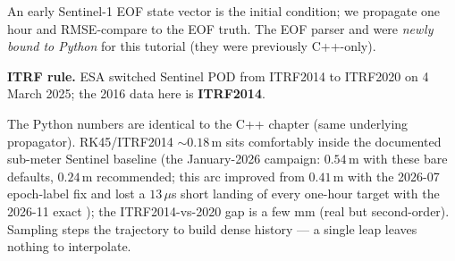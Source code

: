 An early Sentinel-1 EOF state vector is the initial condition; we propagate
one hour and RMSE-compare to the EOF truth. The EOF parser and
 were \emph{newly bound to Python} for
this tutorial (they were previously C++-only).

\textbf{ITRF rule.} ESA switched Sentinel POD from ITRF2014 to ITRF2020 on
4 March 2025; the 2016 data here is \textbf{ITRF2014}.


The Python numbers are identical to the C++ chapter (same underlying
propagator). RK45/ITRF2014 ${\sim}0.18\,$m sits comfortably inside the
documented sub-meter Sentinel baseline (the January-2026 campaign: $0.54\,$m
with these bare defaults, $0.24\,$m recommended; this arc improved from
$0.41\,$m with the 2026-07 epoch-label fix and lost a $13\,\mu$s short
landing of every one-hour target with the 2026-11 exact ); the ITRF2014-vs-2020 gap is a few
mm (real but second-order). Sampling steps the trajectory to build dense
history --- a single  leap leaves nothing to
interpolate.
